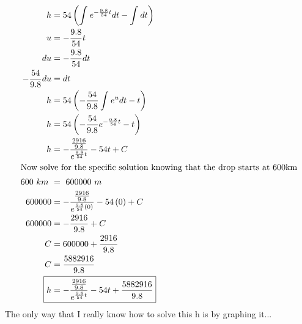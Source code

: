 \documentclass[12pt]{article}
\begin{document}
\begin{align}
  h                       & =54\left(\int_{ }^{ }e^{-\frac{9.8}{54}t}dt-\int_{ }^{ }dt\right)              \\
  u                       & =-\frac{9.8}{54}t                                                              \\
  du                      & =-\frac{9.8}{54}dt                                                             \\
  -\frac{54}{9.8}du       & =dt                                                                            \\
  h                       & =54\left(-\frac{54}{9.8}\int_{ }^{ }e^{u}dt-t\right)                           \\
  h                       & =54\left(-\frac{54}{9.8}e^{-\frac{9.8}{54}t}-t\right)                          \\
  h                       & =-\frac{\frac{2916}{9.8}}{e^{\frac{9.8}{54}t}}-54t+C                           \\
  \intertext{Now solve for the specific solution knowing that the drop starts at 600km}
  600\ km\                & =\ 600000\ m                                                                   \\
  600000                  & =-\frac{\frac{2916}{9.8}}{e^{\frac{9.8}{54}\left(0\right)}}-54\left(0\right)+C \\
  600000                  & =-\frac{2916}{9.8}+C                                                           \\
  C                       & =600000+\frac{2916}{9.8}                                                       \\
  C                       & =\frac{5882916}{9.8}                                                           \\
  \Aboxed{h               & =-\frac{\frac{2916}{9.8}}{e^{\frac{9.8}{54}t}}-54t+\frac{5882916}{9.8}}
\end{align}
The only way that I really know how to solve this h is by graphing it...
\end{document}
